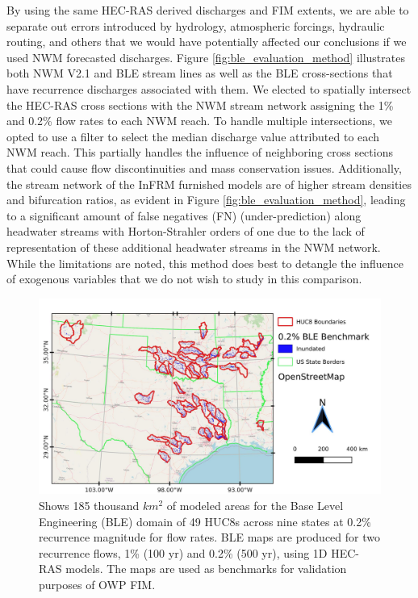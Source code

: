 \documentclass[draft]{dependencies/agujournal2019}
\begin{document}
By using the same HEC-RAS derived discharges and FIM extents, we are able to separate out errors introduced by hydrology, atmospheric forcings, hydraulic routing, and others that we would have potentially affected our conclusions if we used NWM forecasted discharges.
Figure \ref{fig:ble_evaluation_method} illustrates both NWM V2.1 and BLE stream lines as well as the BLE cross-sections that have recurrence discharges associated with them.
We elected to spatially intersect the HEC-RAS cross sections with the NWM stream network assigning the 1\% and 0.2\% flow rates to each NWM reach. 
To handle multiple intersections, we opted to use a filter to select the median discharge value attributed to each NWM reach.
This partially handles the influence of neighboring cross sections that could cause flow discontinuities and mass conservation issues.
Additionally, the stream network of the InFRM furnished models are of higher stream densities and bifurcation ratios, as evident in Figure \ref{fig:ble_evaluation_method}, leading to a significant amount of false negatives (FN) (under-prediction) along headwater streams with Horton-Strahler orders of one due to the lack of representation of these additional headwater streams in the NWM network.
While the limitations are noted, this method does best to detangle the influence of exogenous variables that we do not wish to study in this comparison.
%
\begin{figure}[H]
\centering
\includegraphics[scale=1.0]{figures/all_ble_maps.jpg}
\caption{
Shows 185 thousand $km^2$ of modeled areas for the Base Level Engineering (BLE) domain of 49 HUC8s across nine states at 0.2\% recurrence magnitude for flow rates.
BLE maps are produced for two recurrence flows, 1\% (100 yr) and 0.2\% (500 yr), using 1D HEC-RAS models.
The maps are used as benchmarks for validation purposes of OWP FIM.
}
\label{fig:all_ble_maps}
\end{figure}
\end{document}
